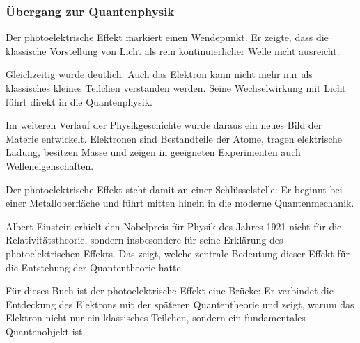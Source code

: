 \subsubsection{Übergang zur Quantenphysik}

Der photoelektrische Effekt markiert einen Wendepunkt.
Er zeigte, dass die klassische Vorstellung von Licht als rein
kontinuierlicher Welle nicht ausreicht.

Gleichzeitig wurde deutlich:
Auch das Elektron kann nicht mehr nur als klassisches kleines Teilchen
verstanden werden. Seine Wechselwirkung mit Licht führt direkt in die
Quantenphysik.

Im weiteren Verlauf der Physikgeschichte wurde daraus ein neues Bild
der Materie entwickelt. Elektronen sind Bestandteile der Atome,
tragen elektrische Ladung, besitzen Masse und zeigen in geeigneten
Experimenten auch Welleneigenschaften.

Der photoelektrische Effekt steht damit an einer Schlüsselstelle:
Er beginnt bei einer Metalloberfläche und führt mitten hinein in die
moderne Quantenmechanik.

\begin{HistoryBox}
	\label{box:einstein-nobelpreis-photoeffekt}
	Albert Einstein erhielt den Nobelpreis für Physik des Jahres 1921
	nicht für die Relativitätstheorie, sondern insbesondere für seine
	Erklärung des photoelektrischen Effekts. Das zeigt, welche zentrale
	Bedeutung dieser Effekt für die Entstehung der Quantentheorie hatte.
\end{HistoryBox}

\begin{NoteBox}
	\label{box:einordnung-photoeffekt}
	Für dieses Buch ist der photoelektrische Effekt eine Brücke:
	Er verbindet die Entdeckung des Elektrons mit der späteren Quantentheorie
	und zeigt, warum das Elektron nicht nur ein klassisches Teilchen,
	sondern ein fundamentales Quantenobjekt ist.
\end{NoteBox}